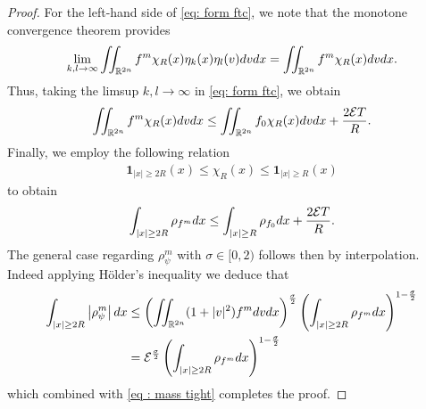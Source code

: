 \documentclass[10pt,a4paper]{amsart}
\newcommand{\R}{\mathbb{R}}
\newcommand{\calE}{\mathcal E}
\newcommand{\dv}{\textnormal{d}v}
\newcommand{\dx}{\textnormal{d}x}
\newcommand{\lt}{\left}
\newcommand{\rt}{\right}
\begin{document}
\begin{proof}
For the left-hand side of \eqref{eq: form ftc}, we note that the monotone convergence theorem provides
\[
\lim_{k,l \to \infty} \iint_{\R^{2n}} f^m \chi_R(x)\eta_k(x)\eta_l(v)\dv\dx = \iint_{\R^{2n}} f^m \chi_R(x) \dv\dx.
\]
Thus, taking the limsup $k,l \to \infty$ in \eqref{eq: form ftc}, we obtain
\[
\iint_{\R^{2n}} f^m \chi_R(x) \dv\dx \le \iint_{\R^{2n}} f_0 \chi_R(x)\dv\dx + \frac{2\calE T}{R}.
\]
Finally, we employ the following relation
\begin{align*}
        \mathbf{1}_{|x|\ge 2R }(x) \le \chi_R(x) \le \mathbf{1}_{|x|\ge R} (x)
\end{align*}
to obtain
\begin{equation}\label{eq : mass tight}
\begin{split}
    \int_{|x|\ge 2R} \rho_{f^m} \dx \le \int_{|x|\ge R} \rho_{f_0}\dx + \frac{2\calE T}{R}.
    \end{split}
\end{equation}
The general case regarding $\rho_{\psi}^m$ with $\sigma \in [0,2)$ follows then by interpolation. Indeed applying H\"older's inequality we deduce that 
\begin{align*}
\int_{|x|\ge 2R} \left|\rho_{\psi}^{m} \right| \dx 
&\le  \lt(\iint_{\R^{2n}} (1+|v|^2) f^m \dv\dx\rt)^{\frac{\sigma}{2}} \lt(\int_{|x|\ge 2R} \rho_{f^{m}} \dx\rt)^{1- \frac{\sigma}{2}}  \\
&= \mathcal{E}^{\frac{\sigma}{2}} \lt(\int_{|x|\ge 2R} \rho_{f^{m}} \dx\rt)^{1- \frac{\sigma}{2}} 
\end{align*}
which combined with \eqref{eq : mass tight} completes the proof.
\end{proof}
\end{document}
